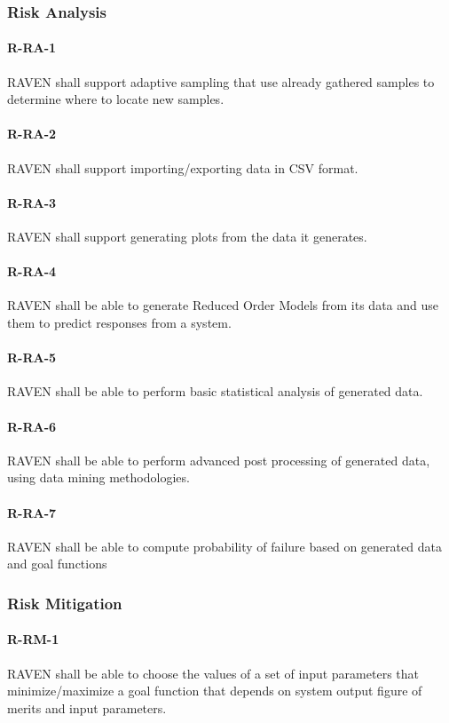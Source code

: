 \subsubsection{Risk Analysis}
\paragraph{R-RA-1} 
RAVEN shall support adaptive sampling that use already gathered samples to determine where to locate new samples.
\paragraph{R-RA-2} 
RAVEN shall support importing/exporting data in CSV format.
\paragraph{R-RA-3} 
RAVEN shall support generating plots from the data it generates.
\paragraph{R-RA-4} 
RAVEN shall be able to generate Reduced Order Models from its data and use them to predict responses from a system.
\paragraph{R-RA-5} 
RAVEN shall be able to perform basic statistical analysis of generated data.
\paragraph{R-RA-6} 
RAVEN shall be able to perform advanced post processing of generated data, using data mining methodologies.
\paragraph{R-RA-7} 
RAVEN shall be able to compute probability of failure based on generated data and goal functions
\subsubsection{Risk Mitigation}
\paragraph{R-RM-1} 
RAVEN shall be able to choose the values of a set of input parameters that minimize/maximize a goal function that depends on system output figure of merits and input parameters.
